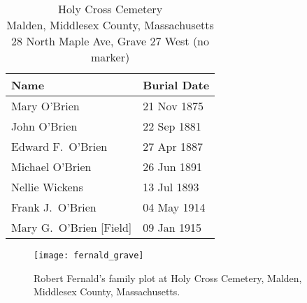 \begin{table}[ht]
	\centering
	\caption{Holy Cross Cemetery\cite{HolyCrossPlotMichael} \\
		Malden, Middlesex County, Massachusetts
		28 North Maple Ave, Grave 27 West (no marker)}
	\begin{tabular}{|l|l|}
		\hline
		\textbf{Name} & \textbf{Burial Date} \\
		\hline
		Mary O'Brien\index{O'Brien!Mary\textsuperscript{3} (1875--1875)} & 21 Nov 1875 \\
		\hline
		John O'Brien\index{O'Brien!John Joseph\textsuperscript{3} (1876--1881)} & 22 Sep 1881 \\
		\hline
		Edward F.\ O'Brien\index{O'Brien!Edward William\textsuperscript{4} (1884--1887)} & 27 Apr 1887 \\
		\hline
		Michael O'Brien\index{O'Brien!Michael\textsuperscript{2}} & 26 Jun 1891 \\
		\hline
		Nellie Wickens\index{Wickens!Nellie\textsuperscript{4}} & 13 Jul 1893 \\
		\hline
		Frank J.\ O'Brien\index{O'Brien!Francis Joseph\textsuperscript{3}} & 04 May 1914 \\
		\hline
		Mary G.\ O'Brien [Field]\index{Field!Mary}\index{O'Brien!Mary (Field)} & 09 Jan 1915 \\
		\hline
	\end{tabular}
\end{table}

\begin{figure}
	\centering
	\texttt{[image: fernald\_grave]}
	\caption{Robert Fernald's family plot at Holy Cross Cemetery, Malden, Middlesex County, Massachusetts.}
	\label{fig:FernaldGrave}
\end{figure}

